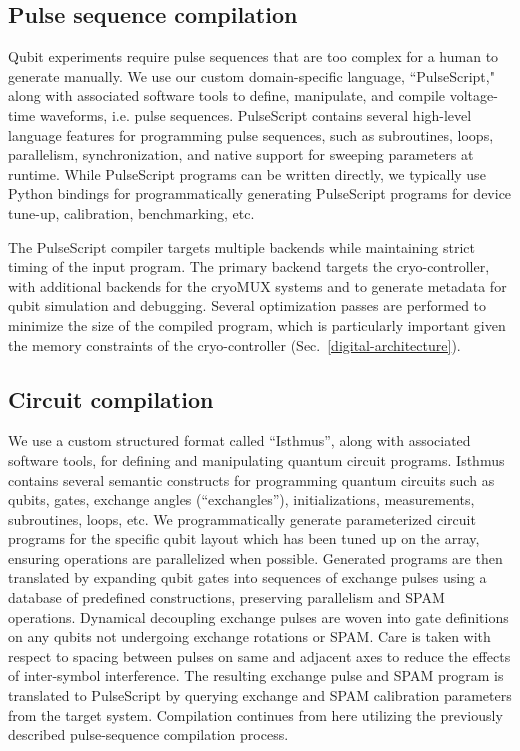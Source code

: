 \documentclass[aps,prl,twocolumn,superscriptaddress,nobibnotes,10pt,floatfix]{revtex4-2}
\newcommand{\secref}[1]{Sec.~\ref{#1}}
\begin{document}
\subsection{Pulse sequence compilation}\label{pulse-sequence-compilation}

Qubit experiments require pulse sequences that are too complex for a human to generate manually.
We use our custom domain-specific language, ``PulseScript," along with associated software tools to define, manipulate, and compile voltage-time waveforms, i.e. pulse sequences.
PulseScript contains several high-level language features for programming pulse sequences, such as subroutines, loops, parallelism, synchronization, and native support for sweeping parameters at runtime.
While PulseScript programs can be written directly, we typically use Python bindings for programmatically generating PulseScript programs for device tune-up, calibration, benchmarking, etc.

The PulseScript compiler targets multiple backends while maintaining strict timing of the input program.
The primary backend targets the cryo-controller, with additional backends for the cryoMUX systems and to generate metadata for qubit simulation and debugging.
Several optimization passes are performed to minimize the size of the compiled program, which is particularly important given the memory constraints of the cryo-controller (\secref{digital-architecture}).

\subsection{Circuit compilation}\label{circuit-compilation}

We use a custom structured format called ``Isthmus'', along with associated software tools, for defining and manipulating quantum circuit programs.
Isthmus contains several semantic constructs for programming quantum circuits such as qubits, gates, exchange angles (``exchangles''), initializations, measurements, subroutines, loops, etc.
We programmatically generate parameterized circuit programs for the specific qubit layout which has been tuned up on the array, ensuring operations are parallelized when possible.
Generated programs are then translated by expanding qubit gates into sequences of exchange pulses using a database of predefined constructions, preserving parallelism and SPAM operations.
Dynamical decoupling exchange pulses are woven into gate definitions on any qubits not undergoing exchange rotations or SPAM.
Care is taken with respect to spacing between pulses on same and adjacent axes to reduce the effects of inter-symbol interference.
The resulting exchange pulse and SPAM program is translated to PulseScript by querying exchange and SPAM calibration parameters from the target system.
Compilation continues from here utilizing the previously described pulse-sequence compilation process.
\end{document}
